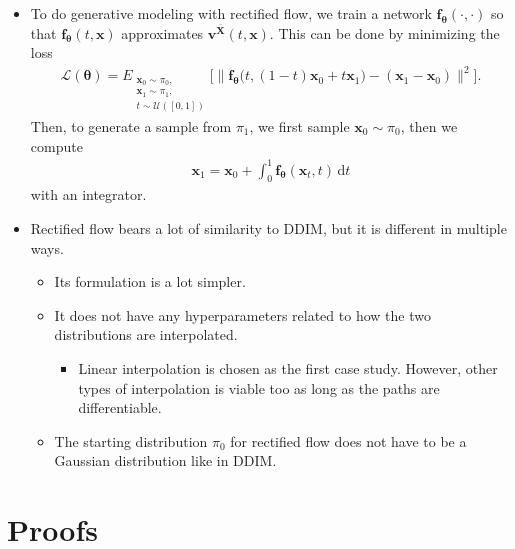 \documentclass[10pt]{article}
\newcommand{\dee}{\mathrm{d}}
\newcommand{\ve}[1]{\mathbf{#1}}
\newcommand{\ves}[1]{\boldsymbol{#1}}
\newcommand{\mcal}[1]{\mathcal{#1}}
\begin{document}
\begin{itemize}
  \item To do generative modeling with rectified flow, we train a network $\ve{f}_{\ves{\theta}}(\cdot, \cdot)$ so that $\ve{f}_{\ves{\theta}}(t, \ve{x})$ approximates $\ve{v}^{\overline{\ve{X}}}(t, \ve{x})$. This can be done by minimizing the loss
  \begin{align*}
    \mcal{L}(\ves{\theta}) = E_{\substack{\ve{x}_0 \sim \pi_0,\\ \ve{x}_1 \sim \pi_1,\\ t \sim \mcal{U}([0,1])}} \Big[ \big\| \ve{f}_{\ves{\theta}}\big(t, (1-t)\ve{x}_0 + t \ve{x}_1\big) - (\ve{x}_1 - \ve{x}_0) \big\|^2 \Big].
  \end{align*}
  Then, to generate a sample from $\pi_1$, we first sample $\ve{x}_0 \sim \pi_0$, then we compute
  \begin{align*}
    \ve{x}_1 = \ve{x}_0 + \int_0^1 \ve{f}_{\ves{\theta}}(\ve{x}_t, t)\, \dee t
  \end{align*}
  with an integrator.

  \item Rectified flow bears a lot of similarity to DDIM, but it is different in multiple ways.
  \begin{itemize}
    \item Its formulation is a lot simpler.
    \item It does not have any hyperparameters related to how the two distributions are interpolated.
    \begin{itemize}
      \item Linear interpolation is chosen as the first case study. However, other types of interpolation is viable too as long as the paths are differentiable.
    \end{itemize}
    \item The starting distribution $\pi_0$ for rectified flow does not have to be a Gaussian distribution like in DDIM.
  \end{itemize}
\end{itemize}

\appendix

\section{Proofs}
\end{document}
